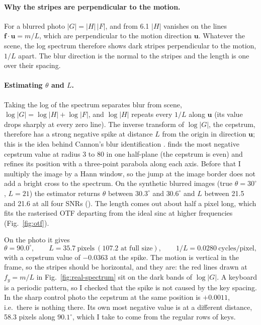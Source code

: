\paragraph{Why the stripes are perpendicular to the motion.} For a blurred photo
$|G|=|H|\,|F|$, and from 6.1 $|H|$ vanishes on the lines
$\mathbf f\cdot\mathbf u=m/L$, which are perpendicular to the motion direction
$\mathbf u$. Whatever the scene, the log spectrum therefore shows dark stripes
perpendicular to the motion, $1/L$ apart. The blur direction is the normal to the
stripes and the length is one over their spacing.

\paragraph{Estimating $\theta$ and $L$.} Taking the log of the spectrum separates
blur from scene, $\log|G|=\log|H|+\log|F|$, and $\log|H|$ repeats every $1/L$
along $\mathbf u$ (its value drops sharply at every zero line). The inverse
transform of $\log|G|$, the cepstrum, therefore has a strong negative spike at
distance $L$ from the origin in direction $\mathbf u$; this is the idea behind
Cannon's blur identification \cite{cannon}.  finds the most
negative cepstrum value at radius 3 to 80 in one half-plane (the cepstrum is
even) and refines its position with a three-point parabola along each axis.
Before that I multiply the image by a Hann window, so the jump at the image border
does not add a bright cross to the spectrum. On the synthetic blurred images (true
$\theta=30^\circ$, $L=21$) the estimator returns $\theta$ between $30.3^\circ$ and
$30.6^\circ$ and $L$ between 21.5 and 21.6 at all four SNRs
(). The length comes out about half a pixel long, which fits
the rasterised OTF departing from the ideal sinc at higher frequencies
(Fig.~\ref{fig:otf}).

On the photo it gives
\[
\theta=90.0^\circ,\qquad L=35.7\ \text{pixels}\ (107.2\text{ at full size}),\qquad 1/L=0.0280\ \text{cycles/pixel},
\]
with a cepstrum value of $-0.0363$ at the spike. The motion is vertical in the
frame, so the stripes should be horizontal, and they are: the red lines drawn at
$f_y=m/L$ in Fig.~\ref{fig:real-spectrum} sit on the dark bands of $\log|G|$. A
keyboard is a periodic pattern, so I checked that the spike is not caused by the
key spacing. In the sharp control photo the cepstrum at the same position is
$+0.0011$, i.e.\ there is nothing there. Its own most negative value is at a
different distance, 58.3 pixels along $90.1^\circ$, which I take to come from the
regular rows of keys.

